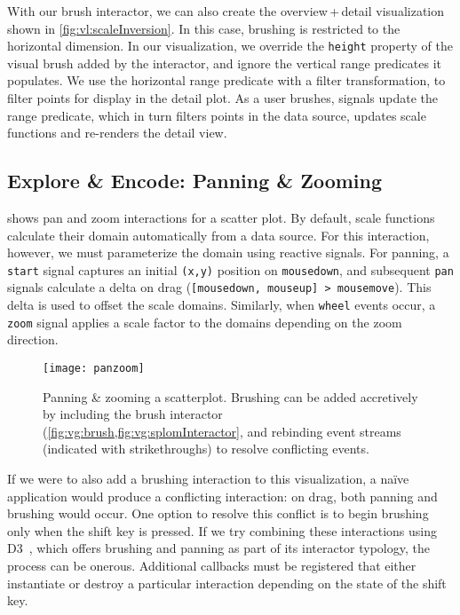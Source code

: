 With our brush interactor, we can also create the overview\,+\,detail
visualization shown in \cref{fig:vl:scaleInversion}. In this case, brushing is
restricted to the horizontal dimension. In our visualization, we override the
\texttt{height} property of the visual brush added by the interactor, and ignore
the vertical range predicates it populates. We use the horizontal range
predicate with a filter transformation, to filter points for display in the
detail plot. As a user brushes, signals update the range predicate, which in
turn filters points in the data source, updates scale functions and re-renders
the detail view.

\subsection{Explore \& Encode: Panning \& Zooming}

 shows pan and zoom interactions for a scatter plot. By
default, scale functions calculate their domain automatically from a data
source. For this interaction, however, we must parameterize the domain using
reactive signals. For panning, a \texttt{start} signal captures an initial
\texttt{(x,y)} position on \texttt{mousedown}, and subsequent \texttt{pan}
signals calculate a delta on drag (\texttt{[mousedown, mouseup] > mousemove}).
This delta is used to offset the scale domains. Similarly, when \texttt{wheel}
events occur, a \texttt{zoom} signal applies a scale factor to the domains
depending on the zoom direction.

\begin{figure}[h!]
  \centering
  \texttt{[image: panzoom]}
  \caption{Panning \& zooming a scatterplot. Brushing can be added accretively
  by including the brush interactor (\cref{fig:vg:brush,fig:vg:splomInteractor},
  and rebinding event streams (indicated with strikethroughs) to resolve
  conflicting events.}
  \label{fig:vg:panzoom}
\end{figure}

If we were to also add a brushing interaction to this visualization, a na\"ive
application would produce a conflicting interaction: on drag, both panning and
brushing would occur. One option to resolve this conflict is to begin brushing
only when the shift key is pressed. If we try combining these interactions using
D3~\cite{bostock:d3}, which offers brushing and panning as part of its
interactor typology, the process can be onerous. Additional callbacks must be
registered that either instantiate or destroy a particular interaction depending
on the state of the shift key.

